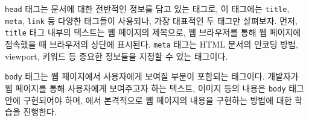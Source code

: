 \texttt{head} 태그는 문서에 대한 전반적인 정보를 담고 있는 태그로, 이 태그에는 \texttt{title}, \texttt{meta}, \texttt{link} 등 다양한 태그들이 사용되나, 가장 대표적인 두 태그만 살펴보자. 먼저, \texttt{title} 태그 내부의 텍스트는 웹 페이지의 제목으로, 웹 브라우저를 통해 웹 페이지에 접속했을 때 브라우저의 상단에 표시된다. \texttt{meta} 태그는 HTML 문서의 인코딩 방법, viewport, 키워드 등 중요한 정보들을 지정할 수 있는 태그이다. 

\texttt{body} 태그는 웹 페이지에서 사용자에게 보여질 부분이 포함되는 태그이다. 개발자가 웹 페이지를 통해 사용자에게 보여주고자 하는 텍스트, 이미지 등의 내용은 \texttt{body} 태그 안에 구현되어야 하며, 에서 본격적으로 웹 페이지의 내용을 구현하는 방법에 대한 학습을 진행한다.
